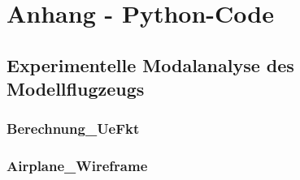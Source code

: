 \chapter*{Anhang - Python-Code}
\label{sec: Anhang}

\appendix

\section{Experimentelle Modalanalyse des Modellflugzeugs}
\label{sec: Anhang_EMA}
    \subsection*{Berechnung\_UeFkt}
        
        \newpage

    \subsection*{Airplane\_Wireframe}
        
        \newpage